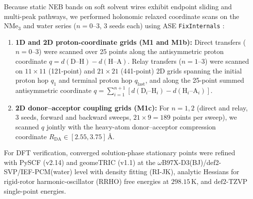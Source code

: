 \documentclass[11pt,a4paper]{article}
\begin{document}
Because static NEB bands on soft solvent wires exhibit endpoint sliding and multi-peak pathways, we performed holonomic relaxed coordinate scans on the $\text{NMe}_3$ and water series ($n = 0$--$3$, 3 seeds each) using ASE \texttt{FixInternals} \cite{larsen2017,bannwarth2019,ehlert2021}:
\begin{enumerate}
\item \textbf{1D and 2D proton-coordinate grids (M1 and M1b):} Direct transfers ($n = 0$--$3$) were scanned over 25 points along the antisymmetric proton coordinate $q = d(\text{D--H}) - d(\text{H--A})$. Relay transfers ($n = 1$--$3$) were scanned on $11\times 11$ (121-point) and $21\times 21$ (441-point) 2D grids spanning the initial proton hop $q_1$ and terminal proton hop $q_{\text{last}}$, and along the 25-point summed antisymmetric coordinate $q = \sum_{i=1}^{n+1}[d(\text{D}_i\text{--H}_i) - d(\text{H}_i\text{--A}_i)]$.
\item \textbf{2D donor--acceptor coupling grids (M1c):} For $n = 1, 2$ (direct and relay, 3 seeds, forward and backward sweeps, $21\times 9 = 189$ points per sweep), we scanned $q$ jointly with the heavy-atom donor--acceptor compression coordinate $R_{\text{DA}} \in [2.55, 3.75]$\,\AA{}.
\end{enumerate}
For DFT verification, converged solution-phase stationary points were refined with PySCF (v2.14) \cite{sun2020} and geomeTRIC (v1.1) \cite{wang2016} at the $\omega$B97X-D3(BJ)/def2-SVP/IEF-PCM(water) level with density fitting (RI-JK), analytic Hessians for rigid-rotor harmonic-oscillator (RRHO) free energies at $298.15$\,K, and $\text{def2-TZVP}$ single-point energies.
\end{document}

